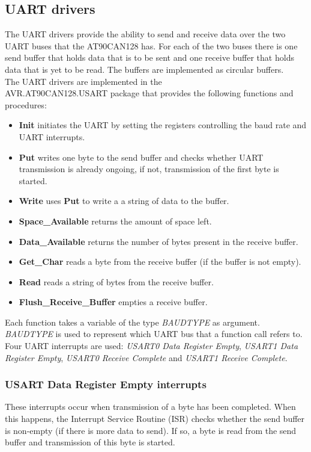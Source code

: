 \subsection{UART drivers}
The UART drivers provide the ability to send and receive data over the two UART buses that the AT90CAN128 has. For each of the two buses there is one send buffer that holds data that is to be sent and one receive buffer that holds data that is yet to be read. The buffers are implemented as circular buffers.  \\
The UART drivers are implemented in the \\
AVR.AT90CAN128.USART package that provides the following functions and procedures:

\begin{itemize}
\item \textbf{Init} initiates the UART by setting the registers controlling the baud rate and UART interrupts.
\item \textbf{Put}  writes one byte to the send buffer and checks whether UART transmission is already ongoing, if not, transmission of the first byte is started. 
\item \textbf{Write} uses \textbf{Put} to write a a string of data to the buffer.
\item \textbf{Space\_Available} returns the amount of space left.
\item \textbf{Data\_Available} returns the number of bytes present in the receive buffer.
\item \textbf{Get\_Char} reads a byte from the receive buffer (if the buffer is not empty).
\item \textbf{Read} reads a string of bytes from the receive buffer.
\item \textbf{Flush\_Receive\_Buffer} empties a receive buffer.
\end{itemize}

Each function takes a variable of the type \textit{BAUDTYPE} as argument. \textit{BAUDTYPE} is used to represent which UART bus that a function call refers to. \\
Four UART interrupts are used: \emph{USART0 Data Register Empty}, \emph{USART1 Data Register Empty}, \emph{USART0 Receive Complete} and \emph{USART1 Receive Complete}. \\


\subsubsection{USART Data Register Empty interrupts}
These interrupts occur when transmission of a byte has been completed. When this happens, the Interrupt Service Routine (ISR) checks whether the send buffer is non-empty (if there is more data to send). If so, a byte is read from the send buffer and transmission of this byte is started.


